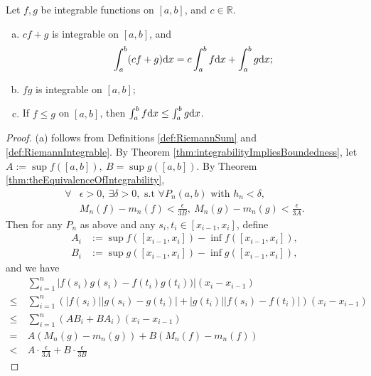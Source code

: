 \begin{thm}
  \label{thm:integralOperationAndQuality}
  Let $f,g$ be integrable functions on $[a,b]$, and $c\in \mathbb{R}$.
  \begin{enumerate}[(a)]
  \item $cf+g$ is integrable on $[a,b]$, and
    \begin{equation}
      \label{eq:linearityOfIntegral}
      \int_{a}^{b}(cf+g)\mathrm{d} x=c\int_{a}^{b}f\mathrm{d} x+\int_{a}^{b}g\mathrm{d} x;
    \end{equation}
  \item $fg$ is integrable on $[a,b]$;
  \item If $f\le g$ on $[a,b]$, then
    $\int_{a}^{b}f\mathrm{d} x\le \int_{a}^{b}g\mathrm{d} x$.
  \end{enumerate}
\end{thm}
\begin{proof}
  (a) follows from Definitions \ref{def:RiemannSum}
  and \ref{def:RiemannIntegrable}.
  By Theorem \ref{thm:integrabilityImpliesBoundedness}, let
  $A:=\sup f([a,b]),\ B=\sup g([a,b])$. By Theorem
  \ref{thm:theEquivalenceOfIntegrability},
  \begin{align*}
     \forall &\epsilon>0,\ \exists \delta>0,\text{ s.t }
     \forall P_{n}(a,b)\text{ with }h_{n}<\delta,\\
     &M_{n}(f)-m_{n}(f)<\frac{\epsilon}{3B},\
      M_{n}(g)-m_{n}(g)<\frac{\epsilon}{3A}.
  \end{align*}
  Then for any $P_{n}$ as above and any $s_{i},t_{i}\in[x_{i-1},x_{i}]$,
  define
  \begin{align*}
    A_{i}&:=\sup f([x_{i-1},x_{i}])-\inf f([x_{i-1},x_{i}]),\\
    B_{i}&:=\sup g([x_{i-1},x_{i}])-\inf g([x_{i-1},x_{i}]),
  \end{align*}
  and we have
  \begin{align*}
     &\ \sum_{i=1}^{n}
          |f(s_{i})g(s_{i})-f(t_{i})g(t_{i}))|(x_{i}-x_{i-1})\\
    \le &\ \sum_{i=1}^{n} (|f(s_{i})||g(s_{i})-g(t_{i})|+
          |g(t_{i})||f(s_{i})-f(t_{i})|)(x_{i}-x_{i-1})\\
    \le &\ \sum_{i=1}^{n} (A B_{i}+B A_{i})(x_{i}-x_{i-1})\\
    = &\ A (M_{n}(g)-m_{n}(g)) + B (M_{n}(f)-m_{n}(f))\\
    < &\ A\cdot \frac{\epsilon}{3A} + B\cdot \frac{\epsilon}{3B}

\end{align*}
\end{proof}
